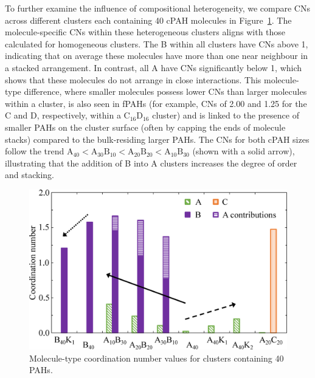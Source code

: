 To further examine the influence of compositional heterogeneity, we compare CNs across different clusters each containing 40 cPAH molecules in Figure~\ref{fig:coordination_numbers}. The molecule-specific CNs within these heterogeneous clusters aligns with those calculated for homogeneous clusters. The B within all clusters have CNs above 1, indicating that on average these molecules have more than one near neighbour in a stacked arrangement. In contrast, all A have CNs significantly below 1, which shows that these molecules do not arrange in close interactions. 
This molecule-type difference, where smaller molecules possess lower CNs than larger molecules within a cluster, is also seen in fPAHs (for example, CNs of 2.00 and 1.25 for the C and D, respectively, within a $\text{C}_{\text{16}}\text{D}_{\text{16}}$ cluster) and is linked to the presence of smaller PAHs on the cluster surface (often by capping the ends of molecule stacks) compared to the bulk-residing larger PAHs.
The CNs for both cPAH sizes follow the trend $\text{A}_{\text{40}} < \text{A}_{\text{30}}\text{B}_{\text{10}} < \text{A}_{\text{20}}\text{B}_{\text{20}} < \text{A}_{\text{10}}\text{B}_{\text{30}}$ (shown with a solid arrow), illustrating that the addition of B into A clusters increases the degree of order and stacking.
%
\begin{figure}[!bth]
\centering
\includegraphics[width=0.8\linewidth]{Figures/CN_bar_chart_updated.eps}
\caption{Molecule-type coordination number values for clusters containing 40 PAHs.}
\label{fig:coordination_numbers}
\end{figure}

